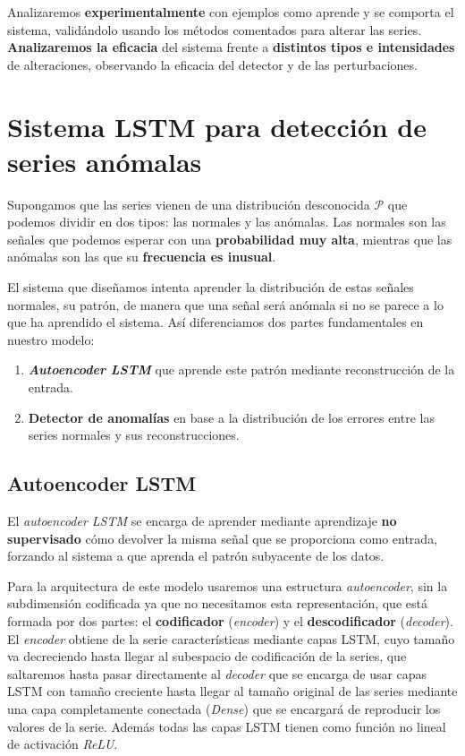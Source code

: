 Analizaremos \textbf{experimentalmente} con ejemplos como aprende y se comporta el sistema, validándolo usando los métodos comentados para alterar las series. \textbf{Analizaremos la eficacia} del sistema frente a \textbf{distintos tipos e intensidades} de alteraciones, observando la eficacia del detector y de las perturbaciones.

\chapter{Sistema LSTM para detección de series anómalas}\label{ch:ad-detector}

Supongamos que las series vienen de una distribución desconocida $\mathcal{P}$ que podemos dividir en dos tipos: las normales y las anómalas. Las normales son las señales que podemos esperar con una \textbf{probabilidad muy alta}, mientras que las anómalas son las que su \textbf{frecuencia es inusual}.

El sistema que diseñamos intenta aprender la distribución de estas señales normales, su patrón, de manera que una señal será anómala si no se parece a lo que ha aprendido el sistema. Así diferenciamos dos partes fundamentales en nuestro modelo:

\begin{enumerate}
  \item \textbf{\emph{Autoencoder LSTM}} que aprende este patrón mediante reconstrucción de la entrada.
  \item \textbf{Detector de anomalías} en base a la distribución de los errores entre las series normales y sus reconstrucciones.
\end{enumerate}

\section{Autoencoder LSTM}

El \emph{autoencoder LSTM} se encarga de aprender mediante aprendizaje \textbf{no supervisado} cómo devolver la misma señal que se proporciona como entrada, forzando al sistema a que aprenda el patrón subyacente de los datos.

Para la arquitectura de este modelo usaremos una estructura \emph{autoencoder}, sin la subdimensión codificada ya que no necesitamos esta representación, que está formada por dos partes: el \textbf{codificador} (\emph{encoder}) y el \textbf{descodificador} (\emph{decoder}). El \emph{encoder} obtiene de la serie características mediante capas LSTM, cuyo tamaño va decreciendo hasta llegar al subespacio de codificación de la series, que saltaremos hasta pasar directamente al \emph{decoder} que se encarga de usar capas LSTM con tamaño creciente hasta llegar al tamaño original de las series mediante una capa completamente conectada (\emph{Dense}) que se encargará de reproducir los valores de la serie. Además todas las capas LSTM tienen como función no lineal de activación \emph{ReLU}.

